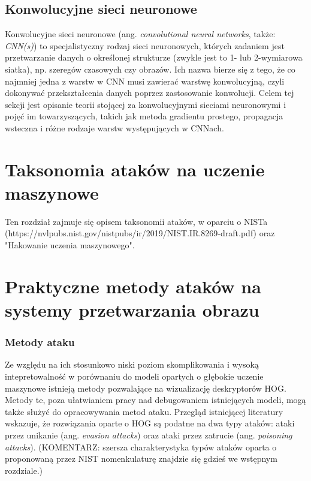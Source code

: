 \documentclass[12pt,a4paper,leqno,oneside,titlepage]{book}
\begin{document}
%
%
%
%
%
%
%
%
%
%
%

\section{Konwolucyjne sieci neuronowe}

Konwolucyjne sieci neuronowe (ang. \textit{convolutional neural networks}, także: \textit{CNN(s)}) to specjalistyczny rodzaj sieci neuronowych, których zadaniem jest przetwarzanie danych o określonej strukturze (zwykle jest to 1- lub 2-wymiarowa siatka), np. szeregów czasowych czy obrazów. Ich nazwa bierze się z tego, że co najmniej jedna z warstw w CNN musi zawierać warstwę konwolucyjną, czyli dokonywać przekształcenia danych poprzez zastosowanie konwolucji.\cite{Goodfellow-et-al-2016} Celem tej sekcji jest opisanie teorii stojącej za konwolucyjnymi sieciami neuronowymi i pojęć im towarzyszących, takich jak metoda gradientu prostego, propagacja wsteczna i różne rodzaje warstw występujących w CNNach.



%
%
%
%
%
%
%
%
%
%

\chapter{Taksonomia ataków na uczenie maszynowe}

Ten rozdział zajmuje się opisem taksonomii ataków, w oparciu o NISTa (https://nvlpubs.nist.gov/nistpubs/ir/2019/NIST.IR.8269-draft.pdf) oraz "Hakowanie uczenia maszynowego".

%
%
%
%
%
%
%
%
%
%

\chapter{Praktyczne metody ataków na systemy przetwarzania obrazu}


\subsection{Metody ataku}
Ze względu na ich stosunkowo niski poziom skomplikowania i wysoką intepretowalność w porównaniu do modeli opartych o głębokie uczenie maszynowe istnieją metody pozwalające na wizualizację deskryptorów HOG. Metody te, poza ułatwianiem pracy nad debugowaniem istniejących modeli, mogą także służyć do opracowywania metod ataku. Przegląd istniejącej literatury wskazuje, że rozwiązania oparte o HOG są podatne na dwa typy ataków: ataki przez unikanie (ang. \textit{evasion attacks}) oraz ataki przez zatrucie (ang. \textit{poisoning attacks})\cite{Hoggles, MacDonald19}. (KOMENTARZ: szersza charakterystyka typów ataków oparta o proponowaną przez NIST nomenkulaturę znajdzie się gdzieś we wstępnym rozdziale.)
\end{document}
